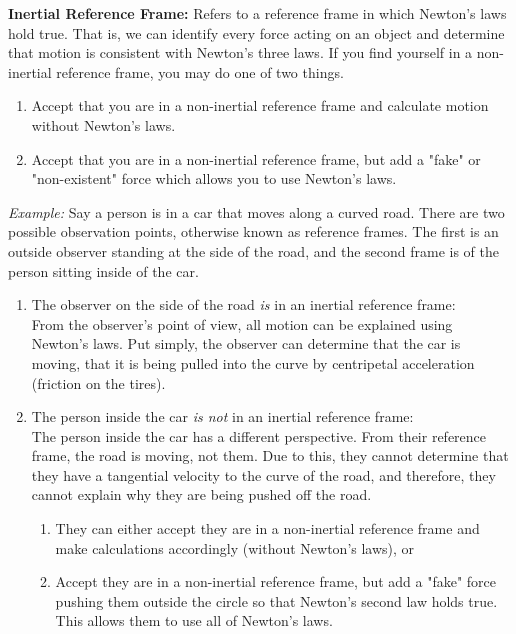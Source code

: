 \documentclass{article}
\begin{document}
\noindent \textbf{Inertial Reference Frame:} Refers to a reference frame in which Newton's laws hold true. That is, we can identify every force acting on an object and determine that motion is consistent with Newton's three laws. If you find yourself in a non-inertial reference frame, you may do one of two things.
\begin{enumerate}
    \item Accept that you are in a non-inertial reference frame and calculate motion without Newton's laws.
    \item Accept that you are in a non-inertial reference frame, but add a "fake" or "non-existent" force which allows you to use Newton's laws.
\end{enumerate}
\textit{Example:} Say a person is in a car that moves along a curved road. There are two possible observation points, otherwise known as reference frames. The first is an outside observer standing at the side of the road, and the second frame is of the person sitting inside of the car.
\begin{enumerate}
    \item The observer on the side of the road \textit{is} in an inertial reference frame: \\
    From the observer's point of view, all motion can be explained using Newton's laws. Put simply, the observer can determine that the car is moving, that it is being pulled into the curve by centripetal acceleration (friction on the tires).
    \item The person inside the car \textit{is not} in an inertial reference frame: \\
    The person inside the car has a different perspective. From their reference frame, the road is moving, not them. Due to this, they cannot determine that they have a tangential velocity to the curve of the road, and therefore, they cannot explain why they are being pushed off the road.
    \begin{enumerate}
        \item They can either accept they are in a non-inertial reference frame and make calculations accordingly (without Newton's laws), or
        \item Accept they are in a non-inertial reference frame, but add a "fake" force pushing them outside the circle so that Newton's second law holds true. This allows them to use all of Newton's laws.
    \end{enumerate}
\end{enumerate}
\end{document}
